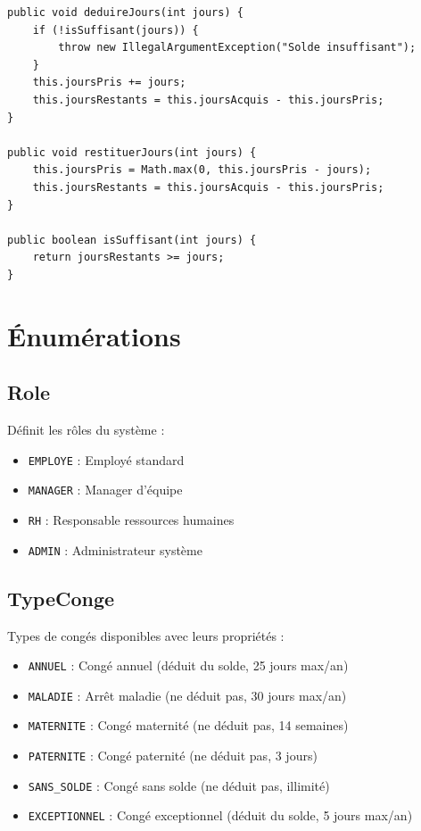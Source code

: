 \documentclass[12pt,a4paper,twoside]{report}
\begin{document}
\begin{lstlisting}[caption=Méthodes de gestion du solde, label=lst:solde]
public void deduireJours(int jours) {
    if (!isSuffisant(jours)) {
        throw new IllegalArgumentException("Solde insuffisant");
    }
    this.joursPris += jours;
    this.joursRestants = this.joursAcquis - this.joursPris;
}

public void restituerJours(int jours) {
    this.joursPris = Math.max(0, this.joursPris - jours);
    this.joursRestants = this.joursAcquis - this.joursPris;
}

public boolean isSuffisant(int jours) {
    return joursRestants >= jours;
}
\end{lstlisting}

\section{Énumérations}

\subsection{Role}

Définit les rôles du système :
\begin{itemize}
    \item \texttt{EMPLOYE} : Employé standard
    \item \texttt{MANAGER} : Manager d'équipe
    \item \texttt{RH} : Responsable ressources humaines
    \item \texttt{ADMIN} : Administrateur système
\end{itemize}

\subsection{TypeConge}

Types de congés disponibles avec leurs propriétés :
\begin{itemize}
    \item \texttt{ANNUEL} : Congé annuel (déduit du solde, 25 jours max/an)
    \item \texttt{MALADIE} : Arrêt maladie (ne déduit pas, 30 jours max/an)
    \item \texttt{MATERNITE} : Congé maternité (ne déduit pas, 14 semaines)
    \item \texttt{PATERNITE} : Congé paternité (ne déduit pas, 3 jours)
    \item \texttt{SANS\_SOLDE} : Congé sans solde (ne déduit pas, illimité)
    \item \texttt{EXCEPTIONNEL} : Congé exceptionnel (déduit du solde, 5 jours max/an)
\end{itemize}
\end{document}

